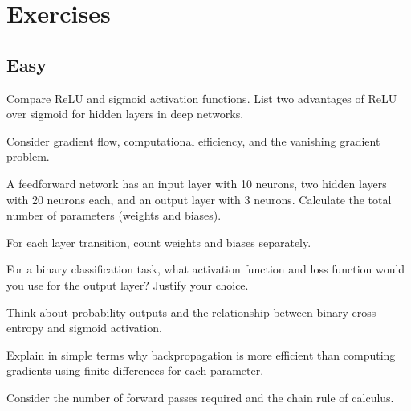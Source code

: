 
\section*{Exercises}

\subsection*{Easy}

\begin{exercisebox}[easy]
\begin{problem}
Compare ReLU and sigmoid activation functions. List two advantages of ReLU over sigmoid for hidden layers in deep networks.
\end{problem}
\begin{hintbox}
Consider gradient flow, computational efficiency, and the vanishing gradient problem.
\end{hintbox}
\end{exercisebox}


\begin{exercisebox}[easy]
\begin{problem}
A feedforward network has an input layer with 10 neurons, two hidden layers with 20 neurons each, and an output layer with 3 neurons. Calculate the total number of parameters (weights and biases).
\end{problem}
\begin{hintbox}
For each layer transition, count weights and biases separately.
\end{hintbox}
\end{exercisebox}


\begin{exercisebox}[easy]
\begin{problem}
For a binary classification task, what activation function and loss function would you use for the output layer? Justify your choice.
\end{problem}
\begin{hintbox}
Think about probability outputs and the relationship between binary cross-entropy and sigmoid activation.
\end{hintbox}
\end{exercisebox}


\begin{exercisebox}[easy]
\begin{problem}
Explain in simple terms why backpropagation is more efficient than computing gradients using finite differences for each parameter.
\end{problem}
\begin{hintbox}
Consider the number of forward passes required and the chain rule of calculus.
\end{hintbox}
\end{exercisebox}


